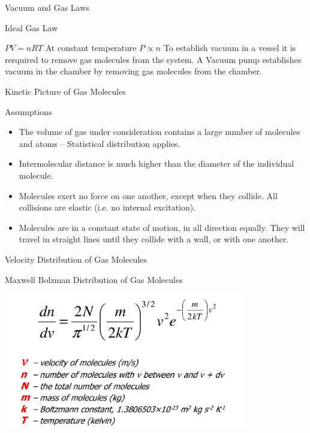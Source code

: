 \documentclass[11]{beamer}
\begin{document}
\begin{frame}{Vacuum and Gas Laws}

\begin{exampleblock}{Ideal Gas Law}

$PV=nRT $ \break
At constant temperature $P \propto n$ \break
To establish vacuum in a vessel it is rerquired to remove gas molecules from the system. A Vacuum pump establishes vacuum in the chamber by removing gas molecules from the chamber.

\end{exampleblock}



\end{frame}





\begin{frame}{Kinetic Picture of Gas Molecules}

 \begin{exampleblock}{Assumptions}
	
	\begin{itemize}
 		\item The volume of gas under consideration contains a large number of molecules and atoms – Statistical distribution applies.
 		\item Intermolecular distance is much higher than the diameter of the individual molecule.
 		\item Molecules exert no force on one another, except when they collide. All collisions are elastic (i.e. no internal excitation).
 		\item Molecules are in a constant state of motion, in all direction equally. They will travel in straight lines until they collide with a wall, or with one another.
	\end{itemize}
 
  \end{exampleblock}

\end{frame}



 \begin{frame}{Velocity Distribution of Gas Molecules}
  
 \begin{exampleblock}{Maxwell Bolzman Distribution of Gas Molecules}
  \begin{center}
    \includegraphics[width=0.8\textwidth]{MaxwellDistribution.png}
  \end{center}
 \end{exampleblock}

\end{frame}
\end{document}
